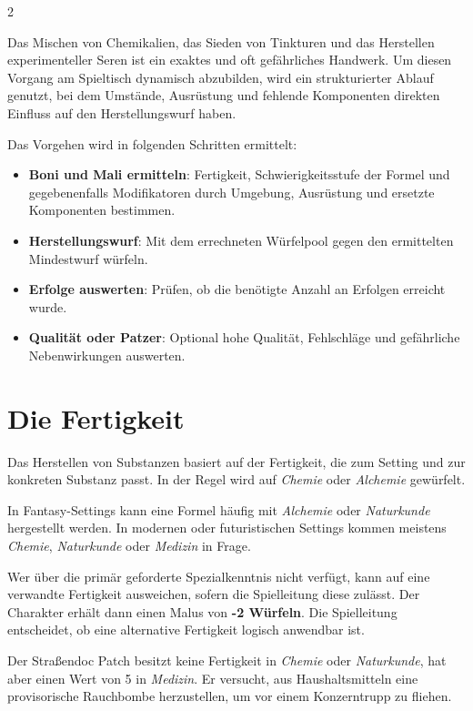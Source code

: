 \label{ch:brewing}

\begin{multicols}{2}

Das Mischen von Chemikalien, das Sieden von Tinkturen und das Herstellen experimenteller Seren ist ein exaktes und oft gefährliches Handwerk. Um diesen Vorgang am Spieltisch dynamisch abzubilden, wird ein strukturierter Ablauf genutzt, bei dem Umstände, Ausrüstung und fehlende Komponenten direkten Einfluss auf den Herstellungswurf haben.

Das Vorgehen wird in folgenden Schritten ermittelt:
\begin{itemize}
    \item \textbf{Boni und Mali ermitteln}: Fertigkeit, Schwierigkeitsstufe der Formel und gegebenenfalls Modifikatoren durch Umgebung, Ausrüstung und ersetzte Komponenten bestimmen.
    \item \textbf{Herstellungswurf}: Mit dem errechneten Würfelpool gegen den ermittelten Mindestwurf würfeln.
    \item \textbf{Erfolge auswerten}: Prüfen, ob die benötigte Anzahl an Erfolgen erreicht wurde.
    \item \textbf{Qualität oder Patzer}: Optional hohe Qualität, Fehlschläge und gefährliche Nebenwirkungen auswerten.
\end{itemize}

\section{Die Fertigkeit}

Das Herstellen von Substanzen basiert auf der Fertigkeit, die zum Setting und zur konkreten Substanz passt. In der Regel wird auf \textit{Chemie} oder \textit{Alchemie} gewürfelt.

In Fantasy-Settings kann eine Formel häufig mit \textit{Alchemie} oder \textit{Naturkunde} hergestellt werden. In modernen oder futuristischen Settings kommen meistens \textit{Chemie}, \textit{Naturkunde} oder \textit{Medizin} in Frage.

Wer über die primär geforderte Spezialkenntnis nicht verfügt, kann auf eine verwandte Fertigkeit ausweichen, sofern die Spielleitung diese zulässt. Der Charakter erhält dann einen Malus von \textbf{-2 Würfeln}. Die Spielleitung entscheidet, ob eine alternative Fertigkeit logisch anwendbar ist.

\begin{pexample}[Beispiel]
Der Straßendoc Patch besitzt keine Fertigkeit in \textit{Chemie} oder \textit{Naturkunde}, hat aber einen Wert von 5 in \textit{Medizin}. Er versucht, aus Haushaltsmitteln eine provisorische Rauchbombe herzustellen, um vor einem Konzerntrupp zu fliehen.


\end{pexample}
\end{multicols}
